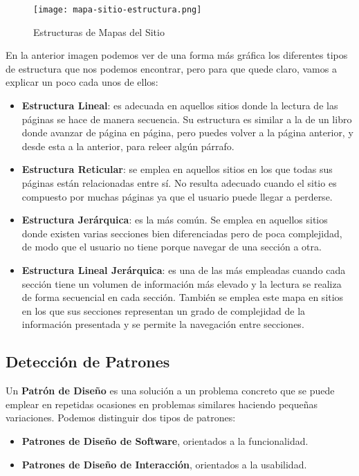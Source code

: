 \begin{figure}[H]
    \centering
    \texttt{[image: mapa-sitio-estructura.png]}
    \caption{Estructuras de Mapas del Sitio}
\end{figure}

En la anterior imagen podemos ver de una forma más gráfica los diferentes tipos de estructura que nos podemos encontrar, pero para que quede claro, vamos a explicar un poco cada unos de ellos:

\begin{itemize}
    \item \textbf{Estructura Lineal}: es adecuada en aquellos sitios donde la lectura de las páginas se hace de manera secuencia. Su estructura es similar a la de un libro donde avanzar de página en página, pero puedes volver a la página anterior, y desde esta a la anterior, para releer algún párrafo.

    \item \textbf{Estructura Reticular}: se emplea en aquellos sitios en los que todas sus páginas están relacionadas entre sí. No resulta adecuado cuando el sitio es compuesto por muchas páginas ya que el usuario puede llegar a perderse.

    \item \textbf{Estructura Jerárquica}: es la más común. Se emplea en aquellos sitios donde existen varias secciones bien diferenciadas pero de poca complejidad, de modo que el usuario no tiene porque navegar de una sección a otra.

    \item \textbf{Estructura Lineal Jerárquica}: es una de las más empleadas cuando cada sección tiene un volumen de información más elevado y la lectura se realiza de forma secuencial en cada sección. También se emplea este mapa en sitios en los que sus secciones representan un grado de complejidad de la información presentada y se permite la navegación entre secciones.
\end{itemize}

\subsection{Detección de Patrones}
Un \textbf{Patrón de Diseño} es una solución a un problema concreto que se puede emplear en repetidas ocasiones en problemas similares haciendo pequeñas variaciones. Podemos distinguir dos tipos de patrones:

\begin{itemize}
    \item \textbf{Patrones de Diseño de Software}, orientados a la funcionalidad.
    \item \textbf{Patrones de Diseño de Interacción}, orientados a la usabilidad.
\end{itemize}

